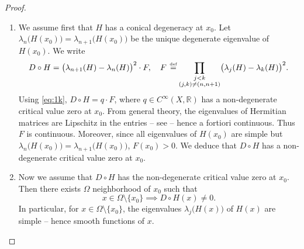 \documentclass[10pt]{amsart}
\theoremstyle{definition}
\newcommand{\R}{\mathbb{R}}
\newcommand{\de}{\,\mathrel{\stackrel{\makebox[0pt]{\mbox{\normalfont\tiny def}}}{=}}}
\providecommand{\skpt}{\par\smallskip\noindent}
\begin{document}
\pagebreak[2]
\skpt
\begin{proof}
\begin{enumerate}
\item
We assume first that $H$ has a conical degeneracy at $x_0$. Let $\lambda_n\bigl( H(x_0) \bigr) = \lambda_{n+1}\bigl( H(x_0) \bigr)$ be the unique degenerate eigenvalue of $H(x_0)$. We write\vspace*{-3pt}
\begin{equation*}
D \circ H = \bigl( \lambda_{n+1}(H) - \lambda_n(H)\bigr)^2 \cdot F, \quad F \de \prod_{\substack{j < k \\ (j,k) \neq (n,n+1)}} \bigl(\lambda_j(H)-\lambda_k(H)\bigr)^2.
\end{equation*}
Using \eqref{eq:1k}, $D \circ H = q \cdot F$, where $q \in C^\infty(X,\R)$ has a non-degenerate critical value zero at $x_0$. From general theory, the eigenvalues of Hermitian matrices are Lipschitz in the entries -- see \cite[Prop.\,6.2]{S10} -- hence a fortiori continuous. Thus $F$ is continuous. Moreover, since all eigenvalues of $H(x_0)$ are simple but $\lambda_n\bigl( H(x_0) \bigr) = \lambda_{n+1}\bigl( H(x_0) \bigr)$, $F(x_0) > 0$. We deduce that $D \circ H$ has a non-degenerate critical value zero at $x_0$.

\item
Now we assume that $D \circ H$ has the non-degenerate critical value zero at $x_0$. Then there exists $\Omega$ neighborhood of $x_0$ such that\vspace*{-3pt}
\begin{equation*}
x \in \Omega \setminus \{ x_0\} \implies D \circ H(x) \neq 0.
\end{equation*}
In particular, for $x \in \Omega \setminus \{ x_0\}$, the eigenvalues $\lambda_j\bigl(H(x)\bigr)$ of $H(x)$ are simple -- hence smooth functions of $x$.


\end{enumerate}
\end{proof}
\end{document}
